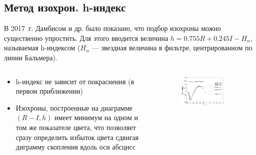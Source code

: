 \documentclass{beamer}
\begin{document}
    \subsection*{Метод изохрон. h-индекс}
    \begin{frame}
    В 2017~г. Дамбисом и др. было показано\cite{Dambis}, что подбор изохроны можно существенно упростить. 
    Для этого вводится величина $h = 0.755R + 0.245I - H_{\alpha}$, называемая h-индексом ($H_{\alpha}$ --- звездная величина в фильтре, центрированном по линии Бальмера).
    \begin{columns}
        \begin{column}{0.5\textwidth}
            \begin{itemize}
                \item h-индекс не зависит от покраснения (в первом приближении)
                \item Изохроны, построенные на диаграмме $\left(R-I, h\right)$ имеет минимум на одном и том же показателе цвета, 
                что позволяет сразу определить избыток цвета сдвигая диграмму скопления вдоль оси абсцисс
            \end{itemize}
        \end{column}
        \begin{column}{0.5\textwidth}
            \begin{figure}
            \centering
                \includegraphics[width=0.8\textwidth]{pictures/Isoh.jpg}
            \end{figure}
        \end{column}
    \end{columns}
    \end{frame}
\end{document}
